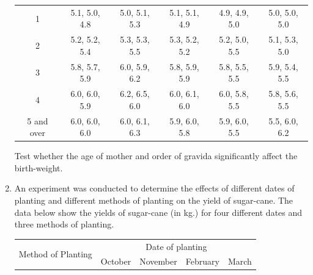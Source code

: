 \documentclass[11pt, a4paper]{article}
\begin{document}
\begin{enumerate}
\begin{table}[h]
\begin{center}
\begin{tabular}{|c|c|c|c|c|c|}
	\hline
	
	1 & 5.1, 5.0, 4.8 & 5.0, 5.1, 5.3 & 5.1, 5.1, 4.9 & 4.9, 4.9, 5.0 & 5.0, 5.0, 5.0 \\
	
	2 & 5.2, 5.2, 5.4 & 5.3, 5.3, 5.5 & 5.3, 5.2, 5.2 & 5.2, 5.0, 5.5 & 5.1, 5.3, 5.0 \\
	
	3 & 5.8, 5.7, 5.9 & 6.0, 5.9, 6.2 & 5.8, 5.9, 5.9 & 5.8, 5.5, 5.5 & 5.9, 5.4, 5.5 \\
	
	4 & 6.0, 6.0, 5.9 & 6.2, 6.5, 6.0 & 6.0, 6.1, 6.0 & 6.0, 5.8, 5.5 & 5.8, 5.6, 5.5 \\
	
	5 and over & 6.0, 6.0, 6.0 & 6.0, 6.1, 6.3 & 5.9, 6.0, 5.8 & 5.9, 6.0, 5.5 & 5.5, 6.0, 6.2 \\
	
	\hline
	
	\end{tabular}
	\end{center}
	
	\end{table}
	
	Test whether the age of mother and order of gravida significantly affect the birth-weight.
	
	
	

\vspace{15pt}	
	
	
	
	
	\item An experiment was conducted to determine the effects of different dates of planting and different methods of planting on the yield of sugar-cane. The data below show the yields of sugar-cane (in kg.) for four different dates and three methods of planting.
	
	\begin{table}[h]
	\def\arraystretch{1.5}
	
	\begin{center}
	\begin{tabular}{|c|c|c|c|c|}
	
	\hline
	
	\multirow{2}{*}{Method of Planting} & \multicolumn{4}{c|}{Date of planting} \\
	
	\hhline{~----}
	
	& October & November & February & March \\
	
	\hline
	

\end{tabular}
\end{center}
\end{table}
\end{enumerate}
\end{document}
